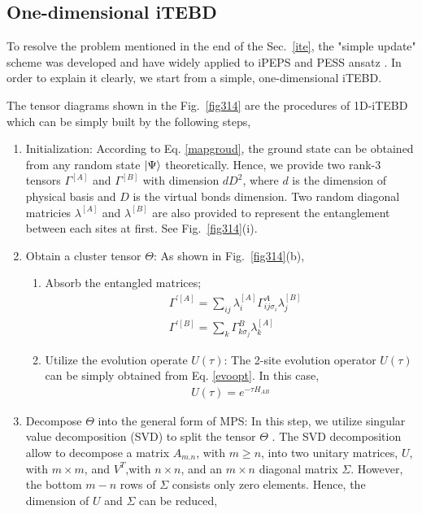 \subsection{One-dimensional iTEBD}
To resolve the problem mentioned in the end of the Sec.~\ref{ite}, the "simple update" scheme was developed and have widely applied to iPEPS and PESS ansatz \cite{PhysRevX.4.011025}. In order to explain it clearly, we start from a simple, one-dimensional iTEBD. 

The tensor diagrams shown in the Fig.~\ref{fig314} are the procedures of 1D-iTEBD which can be simply built by the following steps,
\begin{enumerate}
	\item Initialization: According to Eq. \ref{mapgroud}, the ground state can be obtained from any random state $\Ket{\Psi}$ theoretically. Hence, we provide two rank-3 tensors $\Gamma^{[A]}$ and $\Gamma^{[B]}$ with dimension $dD^2$, where $d$ is the dimension of physical basis and $D$ is the virtual bonds dimension. Two random diagonal matricies $\lambda^{[A]}$ and $\lambda^{[B]}$ are also provided to represent the entanglement between each sites at first. See Fig.~\ref{fig314}(i).
	\item Obtain a cluster tensor $\Theta$: As shown in Fig.~\ref{fig314}(b),
		\begin{enumerate}
			\item Absorb the entangled matrices; 
				\begin{align}
					&\Gamma^{\prime [A]} = \sum_{ij}{\lambda^{[A]}_{i} \Gamma^{A}_{ij \sigma_i} \lambda^{[B]}_{j}} \\
					&\Gamma^{\prime [B]} = \sum_{k}{\Gamma^{B}_{k \sigma_j} \lambda^{[A]}_{k}}
				\end{align}
			\item Utilize the evolution operate $U(\tau)$: The 2-site evolution operator $U(\tau)$ can be simply obtained from Eq. \ref{evoopt}. In this case, 
				\begin{align}
					U(\tau) = e^{-\tau H_{AB}}
				\end{align}
		\end{enumerate}
	\item Decompose $\Theta$ into the general form of MPS: In this step, we utilize singular value decomposition (SVD) to split the tensor $\Theta$ . The SVD decomposition allow to decompose a matrix $A_{m.n}$, with $m \geq n$, into two unitary matrices, $U$, with $m \times m$, and $V^{T}$,with $n \times n$, and an $m \times n$ diagonal matrix $\Sigma$. However, the bottom $m - n$ rows of $\Sigma$ consists only zero elements. Hence, the dimension of $U$ and $\Sigma$ can be reduced,

\end{enumerate}
